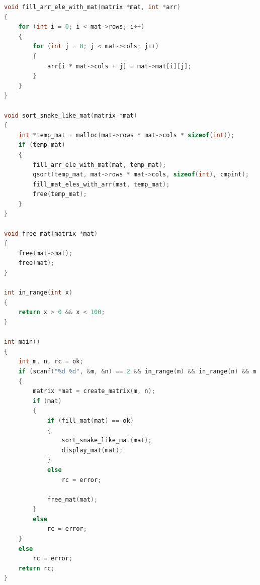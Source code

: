 \documentclass[12pt]{report}
\begin{document}
\begin{lstlisting}[label=some-code,caption=код запушеного программа.,language=C]
void fill_arr_ele_with_mat(matrix *mat, int *arr)
{
    for (int i = 0; i < mat->rows; i++)
    {
        for (int j = 0; j < mat->cols; j++)
        { 
            arr[i * mat->cols + j] = mat->mat[i][j];
        }
    }
}

void sort_snake_like_mat(matrix *mat)
{
    int *temp_mat = malloc(mat->rows * mat->cols * sizeof(int));
    if (temp_mat)
    {
        fill_arr_ele_with_mat(mat, temp_mat);
        qsort(temp_mat, mat->rows * mat->cols, sizeof(int), cmpint);
        fill_mat_eles_with_arr(mat, temp_mat);
        free(temp_mat);
    }
}

void free_mat(matrix *mat)
{
    free(mat->mat);
    free(mat);
}

int in_range(int x)
{
    return x > 0 && x < 100;
}

int main()
{
    int m, n, rc = ok;
    if (scanf("%d %d", &m, &n) == 2 && in_range(m) && in_range(n) && m == n)
    {
        matrix *mat = create_matrix(m, n);
        if (mat)
        {
            if (fill_mat(mat) == ok)
            {
                sort_snake_like_mat(mat);
                display_mat(mat);
            }
            else 
                rc = error;

            free_mat(mat);
        }
        else
            rc = error;
    }
    else
        rc = error;
    return rc;
}
\end{lstlisting}
\end{document}
